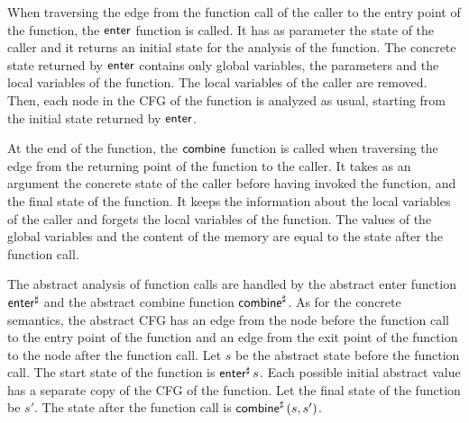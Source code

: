 When traversing the edge from the function call of the caller to the entry point of the function, the $\textsf{enter}$ function is called.
It has as parameter the state of the caller and it returns an initial state for the analysis of the function.
The concrete state returned by $\textsf{enter}$ contains only global variables, the parameters and the local variables of the function.
The local variables of the caller are removed.
Then, each node in the CFG of the function is analyzed as usual,
starting from the initial state returned by $\textsf{enter}$.

At the end of the function, the $\textsf{combine}$ function is called when traversing the edge from the returning point of the function to the caller.
It takes as an argument the concrete state of the caller before having invoked the function,
and the final state of the function.
It keeps the information about the local variables of the caller and forgets the local variables of the function.
The values of the global variables and the content of the memory are equal to the state after the function call.

The abstract analysis of function calls are handled by the abstract enter function $\textsf{enter}^\sharp$ and the abstract combine function $\textsf{combine}^\sharp$.
As for the concrete semantics, the abstract CFG has an edge from the node before the function call to the entry point of the function and an edge from the exit point of the function to the node after the function call.
Let $s$ be the abstract state before the function call.
The start state of the function is $\textsf{enter}^\sharp\,s$.
Each possible initial abstract value has a separate copy of the CFG of the function.
Let the final state of the function be $s'$.
The state after the function call is $\textsf{combine}^\sharp\,(s,s')$.


